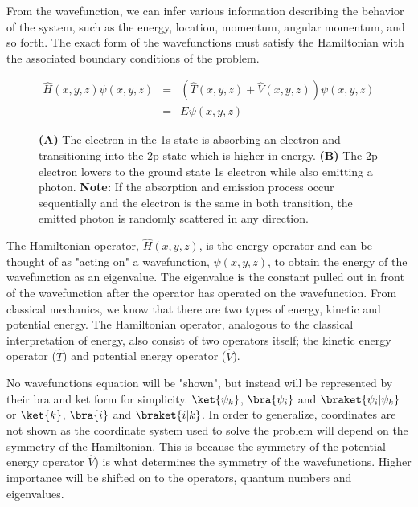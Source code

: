 \documentclass[11pt,a4paper]{book}
\newcommand{\imginput}[1]{} %
\begin{document}
	From the wavefunction, we can infer various information describing the behavior of the system, such as the energy, location, momentum, angular momentum, and so forth. The exact form of the wavefunctions must satisfy the Hamiltonian with the associated boundary conditions of the problem.
	
	\begin{eqnarray}
		\label{eq:hamiltonian of wavefunction in cartesian}
		\hat{H} (x, y, z) \psi(x, y, z)
			&=&\left( \hat{T}(x, y, z) + \hat{V}(x, y, z) \right) \psi(x, y, z)\\
			&=&E\psi(x, y, z)
	\end{eqnarray}
	
	\begin{figure} [!ht]
		\centering
		\large
		\def\svgwidth{\columnwidth}
		\resizebox{15cm}{!}{\imginput{images/photon-electron-transition.pdf_tex}}
		\caption{{\bfseries (A)} The electron in the 1s state is absorbing an electron and transitioning into the 2p state which is higher in energy. 
		\newline
		{\bfseries (B)} The 2p electron lowers to the ground state 1s electron while also emitting a photon. \newline
		\textbf{Note:} If the absorption and emission process occur sequentially and the electron is the same in both transition, the emitted photon is randomly scattered in any direction.}
		\label{fig:photon-electron-transition}
	\end{figure}	
		
	\noindent
	The Hamiltonian operator, $\hat{H}(x,y,z)$, is the energy operator and can be thought of as "acting on" a wavefunction, $\psi(x, y , z)$, to obtain the energy of the wavefunction as an eigenvalue. The eigenvalue is the constant pulled out in front of the wavefunction after the operator has operated on the wavefunction. From classical mechanics, we know that there are two types of energy, kinetic and potential energy. The Hamiltonian operator, analogous to the classical interpretation of energy, also consist of two operators itself; the kinetic energy operator ($\hat{T}$) and potential energy operator ($\hat{V}$).
	
	No wavefunctions equation will be "shown", but instead will be represented by their bra and ket form for simplicity. $\ket{\psi_k}$, $\bra{\psi_i}$ and $\braket{\psi_i|\psi_k}$ or $\ket{k}$, $\bra{i}$ and $\braket{i|k}$. In order to generalize, coordinates are not shown as the coordinate system used to solve the problem will depend on the symmetry of the Hamiltonian. This is because the symmetry of the potential energy operator $\hat{V}$) is what determines the symmetry of the wavefunctions. Higher importance will be shifted on to the operators, quantum numbers and eigenvalues.
	
\end{document}
